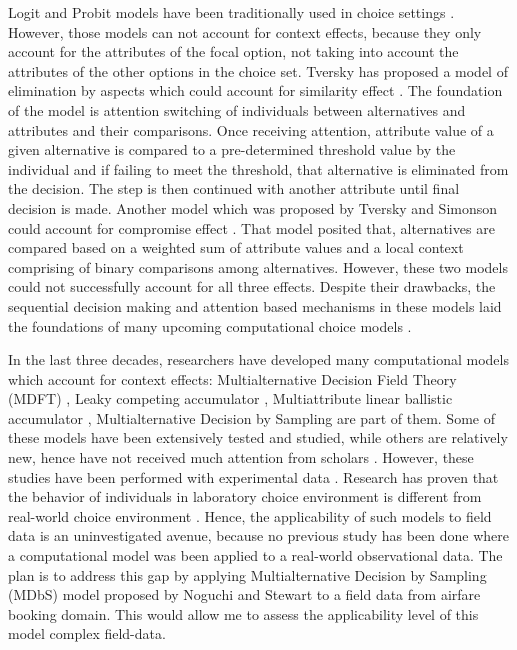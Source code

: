 \documentclass[a4paper,12pt]{article}
\newcommand{\citeyearonly}[1]{\citeyearpar{#1}}
\begin{document}
Logit and Probit models have been traditionally used in choice settings \citep{gensch1979multinomial, kim2017probit}. However, those models can not account for context effects, because they only account for the attributes of the focal option, not taking into account the attributes of the other options in the choice set. Tversky has proposed a model of elimination by aspects which could account for similarity effect \citeyearonly{tversky1972elimination}. The foundation of the model is attention switching of individuals between alternatives and attributes and their comparisons. Once receiving attention, attribute value of a given alternative is compared to a pre-determined threshold value by the individual and if failing to meet the threshold, that alternative is eliminated from the decision. The step is then  continued with another attribute until final decision is made. Another model which was proposed by Tversky and Simonson could account for compromise effect \citeyearonly{tverskySimonson93}. That model posited that, alternatives are compared based on a weighted sum of attribute values and a local context comprising of binary comparisons among alternatives. However, these two models could not successfully account for all three effects. Despite their drawbacks, the sequential decision making and attention based mechanisms in these models laid the foundations of many upcoming computational choice models \citep{bhatia2013associations}. 

In the last three decades, researchers have developed many computational models which account for context effects: Multialternative Decision Field Theory (MDFT) \citep{roe2001multialternative}, Leaky competing
accumulator \citep{usher2001time}, Multiattribute linear ballistic accumulator \citep{trueblood2014multiattribute}, Multialternative Decision by Sampling  \citep{noguchi2018multialternative} are part of them. Some of these models have been extensively tested and studied, while others are relatively new, hence have not received much attention from scholars \citep{truebloodEtAl13}. However, these studies have been performed with experimental data \citep{trueblood2014multiattribute,  berkowitsch2014rigorously, evans2019response, busemeyer2019cognitive}. Research has proven that the behavior of individuals in laboratory choice environment is different from real-world choice environment \citep{hogarth1989risk}. Hence, the applicability of such models to field data is an uninvestigated avenue, because no previous study has been done where a computational model was been applied to a real-world observational data. The plan is to address this gap by applying Multialternative Decision by Sampling (MDbS) model proposed by Noguchi and Stewart \citeyearonly{noguchi2018multialternative} to a field data from airfare booking domain. This would allow me to assess the applicability level of this model complex field-data. 
\end{document}
